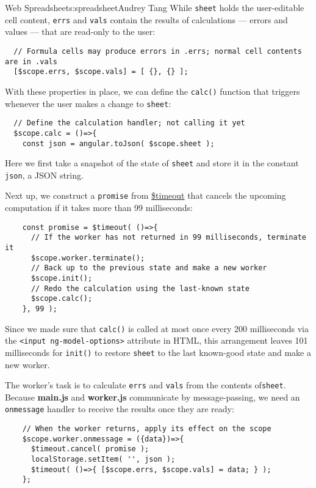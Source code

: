 \begin{aosachapter}{Web Spreadsheet}{s:spreadsheet}{Audrey Tang}
While \texttt{sheet} holds the user-editable cell content, \texttt{errs}
and \texttt{vals} contain the results of calculations --- errors and
values --- that are read-only to the user:

\begin{verbatim}
  // Formula cells may produce errors in .errs; normal cell contents are in .vals
  [$scope.errs, $scope.vals] = [ {}, {} ];
\end{verbatim}

With these properties in place, we can define the \texttt{calc()}
function that triggers whenever the user makes a change to
\texttt{sheet}:

\begin{verbatim}
  // Define the calculation handler; not calling it yet
  $scope.calc = ()=>{
    const json = angular.toJson( $scope.sheet );
\end{verbatim}

Here we first take a snapshot of the state of \texttt{sheet} and store
it in the constant \texttt{json}, a JSON string.

Next up, we construct a \texttt{promise} from
\href{https://docs.angularjs.org/api/ng/service/\$timeout}{\$timeout}
that cancels the upcoming computation if it takes more than 99
milliseconds:

\begin{verbatim}
    const promise = $timeout( ()=>{
      // If the worker has not returned in 99 milliseconds, terminate it
      $scope.worker.terminate();
      // Back up to the previous state and make a new worker
      $scope.init();
      // Redo the calculation using the last-known state
      $scope.calc();
    }, 99 );
\end{verbatim}

Since we made sure that \texttt{calc()} is called at most once every 200
milliseconds via the
\texttt{\textless{}input ng-model-options\textgreater{}} attribute in
HTML, this arrangement leaves 101 milliseconds for \texttt{init()} to
restore \texttt{sheet} to the last known-good state and make a new
worker.

The worker's task is to calculate \texttt{errs} and \texttt{vals} from
the contents of\texttt{sheet}. Because \textbf{main.js} and
\textbf{worker.js} communicate by message-passing, we need an
\texttt{onmessage} handler to receive the results once they are ready:

\begin{verbatim}
    // When the worker returns, apply its effect on the scope
    $scope.worker.onmessage = ({data})=>{
      $timeout.cancel( promise );
      localStorage.setItem( '', json );
      $timeout( ()=>{ [$scope.errs, $scope.vals] = data; } );
    };
\end{verbatim}


\end{aosachapter}
